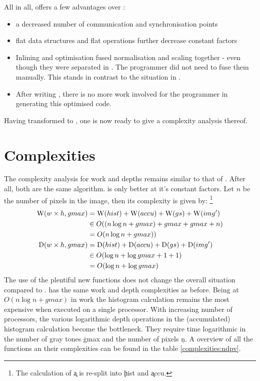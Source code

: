  All in all, \ndpv offers a few advantages over \ndpn:
  \begin{itemize}
    \item a decreased number of communication and synchronisation points
    \item flat data structures and flat operations further decrease constant factors
    \item Inlining and optimisation fused
          normalisation and scaling together - even though
          they were separated in \ndpn. The programmer did not
          need to fuse them manually. This stands in contrast to the situation in \man.
    \item After writing \ndpn, there is no more work involved for the programmer in generating this optimised code.
  \end{itemize}
  Having transformed \ndpn to \ndpv,
  one is now ready to give a complexity analysis thereof.
  
\section{Complexities}
  The complexity analysis for work and depths remains similar to that of \ndpn.
  After all, both are the same algorithm. \ndpv is only better at it's constant factors.
  Let $n$ be the number of pixels in the image,
  then its complexity is given by:
  \footnote{
  The calculation of \c{a} is re-split into \c{hist} and \c{accu}.
  }
  \begin{equation*}
  \begin{split}
  \W(w \times h,gmax)
        & = \W(hist) + \W(accu) + \W(gs) + \comment{\W(expandPS) +} \W(img') \\
        & \in O( (n \log n + gmax) + gmax + gmax \comment{ + 1} + n) \\
        & = O(n \log n + gmax)) \\
  \D(w \times h,gmax)
      & = \D(hist) + \D(accu) + \D(gs) \comment{+ \D(expandPS)} + \D(img') \\
      & \in O(\log n + \log gmax + 1 + 1)  \\
      & = O(\log n + \log gmax) \\
  \end{split}
  \end{equation*}
  The use of the plentiful new functions does not change the overall situation compared to \ndpn.
  \ndpv has the same work and depth complexities as before.
  Being at $O(n \log n + gmax)$ in work
  the histogram calculation remains the most expensive when executed on a single processor.
  With increasing number of processors, the various logarithmic depth
  operations in the (accumulated) histogram calculation become the bottleneck.
  They require time logarithmic in the number of gray tones
  \c{gmax} and the number of pixels \c{n}.
  A overview of all the functions an their complexities can be found in the table \ref{complexities:ndpv}.
  
